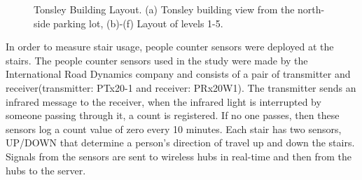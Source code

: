 \begin{itemize}
\begin{figure}[ht]
\caption{Tonsley Building Layout. (a) Tonsley building view from the north-side parking lot, (b)-(f) Layout of levels 1-5.}
\label{laay}
\end{figure}

In order to measure stair usage, people counter sensors were deployed at the stairs. The people counter sensors used in the study were made by the International Road Dynamics company and consists of a pair of transmitter and receiver(transmitter: PTx20-1 and receiver: PRx20W1). The transmitter sends an infrared message to the receiver, when the infrared light is interrupted by someone passing through it, a count is registered. If no one passes, then these sensors log a count value of zero every 10 minutes. Each stair has two sensors, UP/DOWN that determine a person's direction of travel up and down the stairs. Signals from the sensors are sent to wireless hubs in real-time and then from the hubs to the server. 






\end{itemize}
